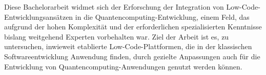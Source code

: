 

Diese Bachelorarbeit widmet sich der Erforschung der Integration von Low-Code-Entwicklungsansätzen in die Quantencomputing-Entwicklung, 
einem Feld, das aufgrund der hohen Komplexität und der erforderlichen spezialisierten Kenntnisse bislang weitgehend Experten vorbehalten war. 
Ziel der Arbeit ist es, zu untersuchen, inwieweit etablierte Low-Code-Plattformen, die in der klassischen Softwareentwicklung Anwendung finden, 
durch gezielte Anpassungen auch für die Entwicklung von Quantencomputing-Anwendungen genutzt werden können.

